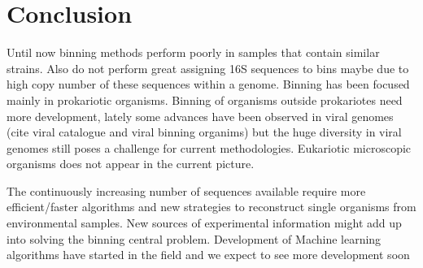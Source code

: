 \documentclass{article}
\begin{document}

\section{Conclusion}
Until now binning methods perform poorly in samples that contain similar strains. Also do not perform great assigning 16S sequences to bins maybe due to high copy number of these sequences within a genome.
Binning has been focused mainly in prokariotic organisms. Binning of organisms outside prokariotes need more development, lately some advances have been observed in viral genomes  (cite viral catalogue and viral binning organims) but the huge diversity in viral genomes still poses a challenge for current methodologies. Eukariotic microscopic organisms does not appear in the current picture. 

The continuously increasing number of sequences available require more efficient/faster algorithms and new strategies to reconstruct single organisms from environmental samples.
New sources of experimental information might add up into solving the binning central problem.
Development of Machine learning algorithms have started in the field and we expect to see more development soon




\end{document}
